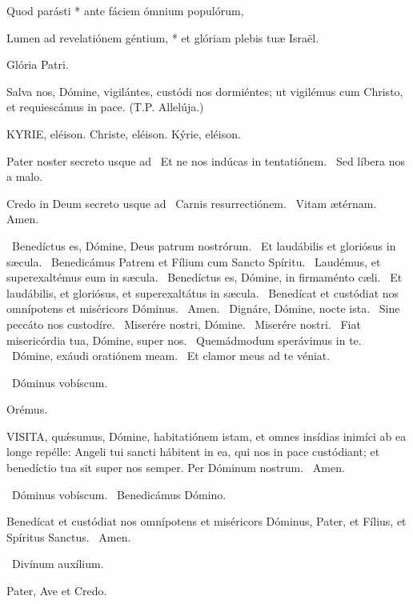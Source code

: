 Quod parásti * ante fáciem ómnium populórum,

Lumen ad revelatiónem géntium, * et glóriam plebis tuæ Israël.

Glória Patri.

 Salva nos, Dómine, vigilántes, custódi nos dormiéntes; ut vigilémus cum Christo, et requiescámus in pace. (T.P. Allelúja.)


KYRIE, eléison. Christe, eléison. Kýrie, eléison.

Pater noster secreto usque ad \V\ Et ne nos indúcas in tentatiónem. \R\ Sed líbera nos a malo.

Credo in Deum secreto usque ad \V\ Carnis resurrectiónem. \R\ Vitam ætérnam. Amen.

\V\ Benedíctus es, Dómine, Deus patrum nostrórum. \R\ Et laudábilis et gloriósus in sæcula. \V\ Benedicámus Patrem et Fílium cum Sancto Spíritu. \R\ Laudémus, et superexaltémus eum in sæcula. \V\ Benedíctus es, Dómine, in firmaménto cæli. \R\ Et laudábilis, et gloriósus, et superexaltátus in sæcula. \V\ Benedícat et custódiat nos omnípotens et miséricors Dóminus. \R\ Amen. \V\ Dignáre, Dómine, nocte ista. \R\ Sine peccáto nos custodíre. \V\ Miserére nostri, Dómine. \R\ Miserére nostri. \V\ Fiat misericórdia tua, Dómine, super nos. \R\ Quemádmodum sperávimus in te. \V\ Dómine, exáudi oratiónem meam. \R\ Et clamor meus ad te véniat.

\V\ Dóminus vobíscum.

Orémus. 

\lettrine[lines=2]{V}{ISITA}, quǽsumus, Dómine, habitatiónem istam, et omnes insídias inimíci ab ea longe repélle: Angeli tui sancti hábitent in ea, qui nos in pace custódiant; et benedíctio tua sit super nos semper. Per Dóminum nostrum. \R\ Amen.

\V\ Dóminus vobíscum. \V\ Benedicámus Dómino.

 Benedícat et custódiat nos omnípotens et miséricors Dóminus, Pater, et Fílius, et Spíritus Sanctus. \R\ Amen.


\V\ Divínum auxílium.

Pater, Ave et Credo.


